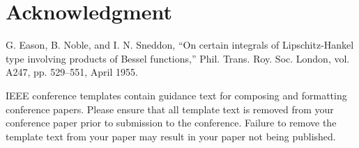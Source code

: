 \documentclass[conference]{IEEEtran}
\begin{document}
\section*{Acknowledgment}




\begin{thebibliography}{00}
	 G. Eason, B. Noble, and I. N. Sneddon, ``On certain integrals of Lipschitz-Hankel type involving products of Bessel functions,'' Phil. Trans. Roy. Soc. London, vol. A247, pp. 529--551, April 1955.
\end{thebibliography}
\vspace{12pt}
\color{red}
IEEE conference templates contain guidance text for composing and formatting conference papers. Please ensure that all template text is removed from your conference paper prior to submission to the conference. Failure to remove the template text from your paper may result in your paper not being published.
\end{document}
